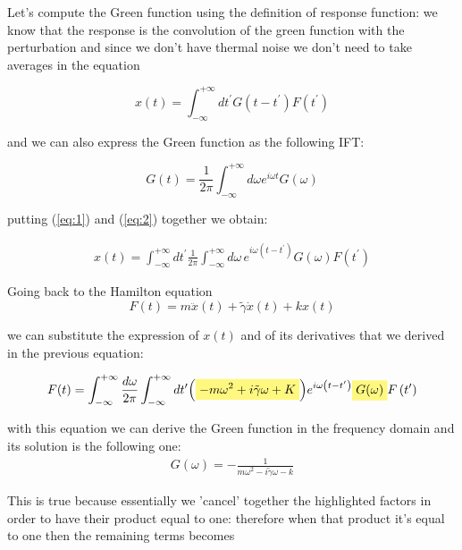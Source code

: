 \documentclass[\main/main.tex]{subfiles}
\begin{document}
Let's compute the Green function using the definition of response function: we know that the response is the convolution of the green function with the perturbation and since we don't have thermal noise we don't need to take averages in the equation

\begin{equation}
    x(t)=\int_{-\infty}^{+\infty} d t^{\prime} G\left(t-t^{\prime}\right) F\left(t^{\prime}\right)
    \label{eq:1}
\end{equation}

and we can also express the Green function as the following IFT:

\begin{equation}
    G(t)=\frac{1}{2 \pi} \int_{-\infty}^{+\infty} d \omega e^{i \omega t} G(\omega)
    \label{eq:2}
\end{equation}

putting (\ref{eq:1}) and (\ref{eq:2}) together we obtain:

\begin{eqnarray}
x(t)=\int_{-\infty}^{+\infty} d t^{\prime} \frac{1}{2 \pi} \int_{-\infty}^{+\infty} d \omega \,e^{i \omega\left(t-t^{\prime}\right)} G(\omega) F\left(t^{\prime}\right)
\end{eqnarray}

Going back to the Hamilton equation
\begin{equation}
F(t) = m \ddot{x}(t)+\tilde{\gamma} \dot{x}(t)+k x(t)
\end{equation}

we can substitute the expression of $x(t)$ and of its derivatives that we derived in the previous equation: 

\begin{eqnarray}
F(t) = \int_{-\infty}^{+\infty} \frac{d \omega}{2 \pi} \int_{-\infty}^{+\infty} d t^{\prime}{\left(\hlc{yellow}{-m \omega^{2}+i \tilde{\gamma} \omega+K}\right)} e^{i \omega\left(t-t^{\prime}\right)} \hlc{yellow}{G(\omega)} F\left(t^{\prime}\right)
\end{eqnarray}

with this equation we can derive the Green function in the frequency domain and its solution is the following one:
\begin{eqnarray}
G(\omega)=-\frac{1}{m \omega^{2}-i \tilde{\gamma} \omega-k}
\end{eqnarray}

This is true because essentially we 'cancel' together the highlighted factors in order to have their product equal to one: therefore when that product it's equal to one then the remaining terms becomes
\end{document}
